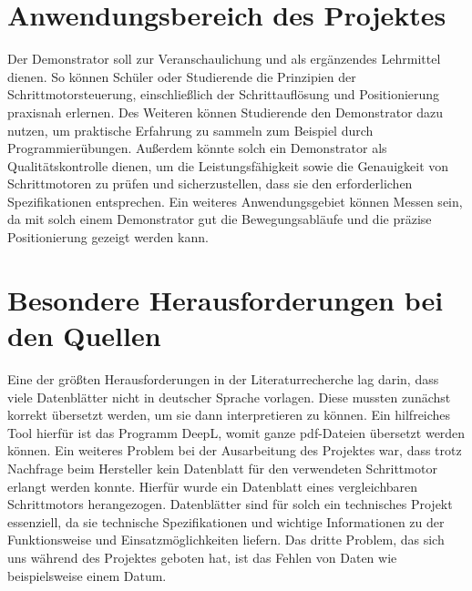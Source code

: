 
\section{Anwendungsbereich des Projektes}

Der Demonstrator soll zur Veranschaulichung und als ergänzendes Lehrmittel dienen. So können Schüler oder Studierende die Prinzipien der Schrittmotorsteuerung, einschließlich der Schrittauflösung und Positionierung praxisnah erlernen. Des Weiteren können Studierende den Demonstrator dazu nutzen, um praktische Erfahrung zu sammeln zum Beispiel durch Programmierübungen. Außerdem könnte solch ein Demonstrator als Qualitätskontrolle dienen, um die Leistungsfähigkeit sowie die Genauigkeit von Schrittmotoren zu prüfen und sicherzustellen, dass sie den erforderlichen Spezifikationen entsprechen. Ein weiteres Anwendungsgebiet können Messen sein, da mit solch einem Demonstrator gut die Bewegungsabläufe und die präzise Positionierung gezeigt werden kann. 

\section{Besondere Herausforderungen bei den Quellen}

Eine der größten Herausforderungen in der Literaturrecherche lag darin, dass viele Datenblätter nicht in deutscher Sprache vorlagen. Diese mussten zunächst korrekt übersetzt werden, um sie dann interpretieren zu können. Ein hilfreiches Tool hierfür ist das Programm DeepL, womit ganze pdf-Dateien übersetzt werden können. Ein weiteres Problem bei der Ausarbeitung des Projektes war, dass trotz Nachfrage beim Hersteller kein Datenblatt für den verwendeten Schrittmotor erlangt werden konnte. Hierfür wurde ein Datenblatt eines vergleichbaren Schrittmotors herangezogen. Datenblätter sind für solch ein technisches Projekt essenziell, da sie technische Spezifikationen und wichtige Informationen zu der Funktionsweise und Einsatzmöglichkeiten liefern. Das dritte Problem, das sich uns während des Projektes geboten hat, ist das Fehlen von Daten wie beispielsweise einem Datum.


